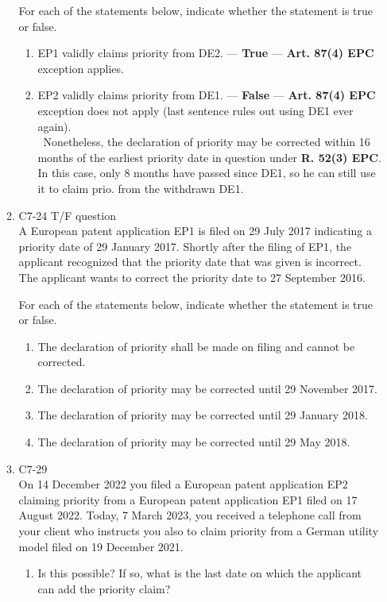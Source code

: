\documentclass{report}
\newcommand{\p}{\adforn{61} \ }
\newcommand{\T}{--- \textbf{True} }
\newcommand{\F}{--- \textbf{False} }
\begin{document}
\begin{enumerate}[label=\textbf{Answer \arabic*}]
\begin{enumerate}[label=\textbf{Answer \arabic*}]
    \vspace{1em}
    For each of the statements below, indicate whether the statement is true or false.
    \begin{enumerate}[label=(\alph*)]
        \item EP1 validly claims priority from DE2. \T --- \textbf{Art. 87(4) EPC} exception applies.
        \item EP2 validly claims priority from DE1. \F --- \textbf{Art. 87(4) EPC} exception does not apply (last sentence rules out using DE1 ever again). \\
\p Nonetheless, the declaration of priority may be corrected within 16 months of the earliest priority date in question under \textbf{R. 52(3) EPC}. In this case, only 8 months have passed since DE1, so he can still use it to claim prio. from the withdrawn DE1.
    \end{enumerate}

    \item %
    C7-24 \qquad T/F question \\
    A European patent application EP1 is filed on 29 July 2017 indicating a priority date of 29 January 2017. Shortly after the filing of EP1, the applicant recognized that the priority date that was given is incorrect. The applicant wants to correct the priority date to 27 September 2016.
    
    \vspace{1em}
    For each of the statements below, indicate whether the statement is true or false.
    
    \begin{enumerate}[label=(\alph*)]
        \item The declaration of priority shall be made on filing and cannot be corrected.
        \item The declaration of priority may be corrected until 29 November 2017.
        \item The declaration of priority may be corrected until 29 January 2018.
        \item The declaration of priority may be corrected until 29 May 2018.
    \end{enumerate}

    \item %
    C7-29 \\
    On 14 December 2022 you filed a European patent application EP2 claiming priority from a European patent application EP1 filed on 17 August 2022. Today, 7 March 2023, you received a telephone call from your client who instructs you also to claim priority from a German utility model filed on 19 December 2021.
    \begin{enumerate}[label=(\alph*)]
        \item Is this possible? If so, what is the last date on which the applicant can add the priority claim?
    \end{enumerate}
    

\end{enumerate}
\end{enumerate}
\end{document}
